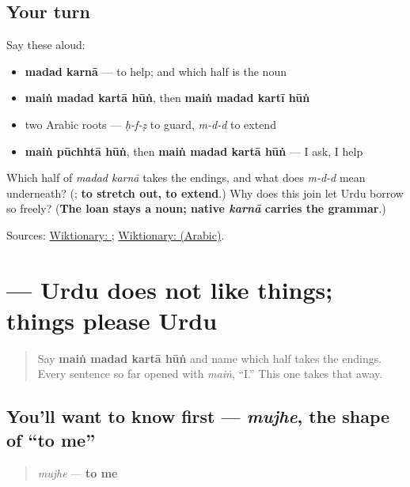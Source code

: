\subsection*{Your turn}
Say these aloud:

\begin{itemize}
\raggedright
  \item \textbf{madad karnā} — to help; and which half is the noun
  \item \textbf{maiṅ madad kartā hūṅ}, then \textbf{maiṅ madad kartī hūṅ}
  \item two Arabic roots — \emph{ḥ-f-ẓ} to guard, \emph{m-d-d} to extend
  \item \textbf{maiṅ pūchhtā hūṅ}, then \textbf{maiṅ madad kartā hūṅ} — I ask, I help
\end{itemize}

\begin{tcolorbox}[breakable,colback=teal!4,colframe=teal!35!black,title={Before you move on}]
Which half of \emph{madad karnā} takes the endings, and what does \emph{m-d-d} mean underneath? (\textbf{}; \textbf{to stretch out, to extend}.) Why does this join let Urdu borrow so freely? (\textbf{The loan stays a noun; native \emph{karnā} carries the grammar}.)

Sources: \href{https://en.wiktionary.org/wiki/\%D9\%85\%D8\%AF\%D8\%AF}{Wiktionary: }; \href{https://en.wiktionary.org/wiki/\%D9\%85\%D8\%AF\#Arabic}{Wiktionary:  (Arabic)}.
\end{tcolorbox}
\section[\texorpdfstring{\ur{پسند} (pasand)}{پسند (pasand)}]{ — Urdu does not like things; things please Urdu}

\label{lesson:UR-C08-pasand}



\begin{quote}
Say \textbf{maiṅ madad kartā hūṅ} and name which half takes the endings. Every sentence so far opened with \textbf{} \emph{maiṅ}, “I.” This one takes that away.
\end{quote}

\subsection*{You'll want to know first — \emph{mujhe}, the shape of “to me”}
\begin{quote}
\emph{mujhe} — \textbf{to me}
\end{quote}

